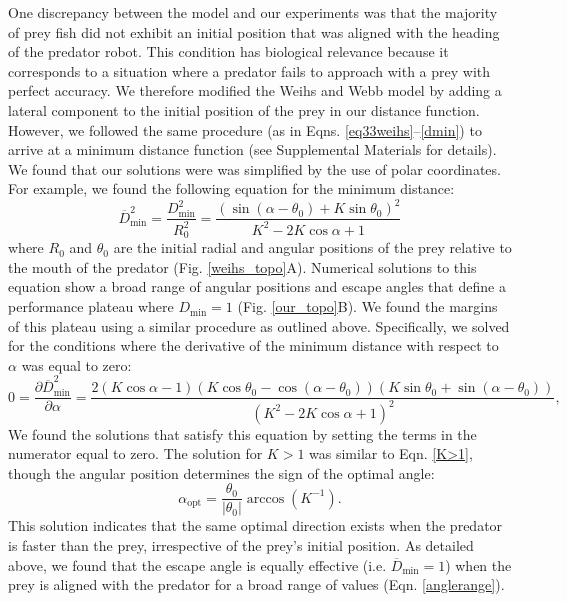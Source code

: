 \documentclass[12pt]{article}
\def\ds{\displaystyle}
\def\d{\partial}
\newcommand{\ol}{\overline}
\begin{document}
One discrepancy between the model and our experiments was that the majority of prey fish did not exhibit an initial position that was aligned with the heading of the predator robot. This condition has biological relevance because it corresponds to a situation where a predator fails to approach with a prey with perfect accuracy. 
We therefore modified the Weihs and Webb model by adding a lateral component to the initial position of the prey in our distance function. 
However, we followed the same procedure (as in Eqns. \ref{eq33weihs}--\ref{dmin}) to arrive at a minimum distance function (see Supplemental Materials for details). We found that our solutions were was simplified by the use of polar coordinates. For example, we found the following equation for the minimum distance:
%
\begin{equation}
\ol{D}^2_{\text{min}}= \ds\frac{{D}^2_{\text{min}}}{R_0^2 }=
\ds\frac{\left ( \sin(\alpha - \theta_0) + K \sin \theta_0 \right )^2}{K^2-2 K \cos \alpha +1} 
\label{Dmin_polar}
\end{equation}
%
where $R_0$ and $\theta_0$ are the initial radial and angular positions of the prey relative to the mouth of the predator (Fig. \ref{weihs_topo}A). Numerical solutions to this equation show a broad range of angular positions and escape angles that define a performance plateau where $D_{\text{min}}=1$ (Fig. \ref{our_topo}B). 
We found the margins of this plateau using a similar procedure as outlined above. Specifically, we solved for the conditions where the derivative of the minimum distance with respect to $\alpha$ was equal to zero:
%
\begin{equation}
0 = \frac{\d \ol{D}^2_{\text{min}}}{\d \alpha} = 
\frac{2(K \cos \alpha - 1)(K\cos \theta_0 - \cos(\alpha - \theta_0))(K\sin \theta_0 + \sin(\alpha -\theta_0))}
{(K^2 - 2K \cos \alpha + 1)^2},
\label{DminDalpha}
\end{equation} 
%
We found the solutions that satisfy this equation by setting the terms in the numerator equal to zero. The solution for $K>1$ was similar to Eqn. \ref{K>1}, though the angular position determines the sign of the optimal angle: 
%
\begin{equation}
\alpha_{\text{opt}} = \frac{\theta_0}{|\theta_0|}  \arccos(K^{-1}).
\label{DminDalpha}
\end{equation} 
%
This solution indicates that the same optimal direction exists when the predator is faster than the prey, irrespective of the prey's initial position. As detailed above, we found that the escape angle is equally effective (i.e. $\ol D_{\text{min}}=1$) when the prey is aligned with the predator for a broad range of values (Eqn. \ref{anglerange}). 
\end{document}
